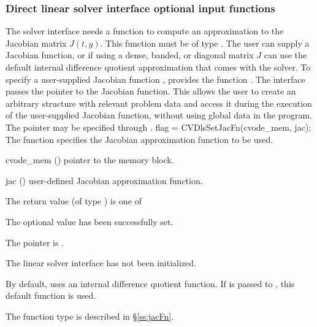 \subsubsection{Direct linear solver interface optional input functions}
\label{sss:optin_dls}
The 
{\cvdls} solver interface needs a function to compute an approximation to
the Jacobian matrix $J(t,y)$.  This function must be of type . 
The user can supply a Jacobian function, or if using a
dense, banded, or diagonal matrix $J$ can use the default 
internal difference quotient approximation
that comes with the {\cvdls} solver.
To specify a user-supplied Jacobian function , {\cvdls} provides 
the function .
The {\cvdls} interface passes the pointer  
to the Jacobian function. This allows the user to
create an arbitrary structure with relevant problem data and access it
during the execution of the user-supplied Jacobian function, without
using global data in the program.  
The pointer  may be specified through .
{
  flag = CVDlsSetJacFn(cvode\_mem, jac);
}
{
  The function  specifies the Jacobian
  approximation function to be used.
}
{
  \begin{args}
  \item[cvode\_mem] ()
    pointer to the {\cvode} memory block.
  \item[jac] ()
    user-defined Jacobian approximation function.
  \end{args}
}
{
  The return value  (of type ) is one of
  \begin{args}
  \item[\Id{CVDLS\_SUCCESS}] 
    The optional value has been successfully set.
  \item[\Id{CVDLS\_MEM\_NULL}]
    The  pointer is .
  \item[\Id{CVDLS\_LMEM\_NULL}]
    The {\cvdls} linear solver interface has not been initialized.
  \end{args}
}
{
  By default, {\cvdls} uses an internal difference quotient function.
  If  is passed to , this default function is used.

  The function type  is described in \S\ref{ss:jacFn}.
}

